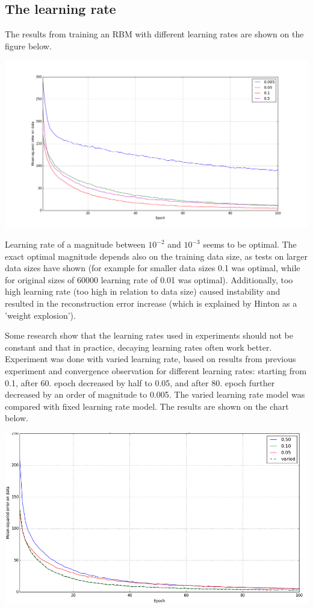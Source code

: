 \documentclass[a4paper]{scrartcl}
\begin{document}
\subsection{The learning rate}
\par The results from training an RBM with different learning rates are shown on the figure below.
\begin{center}
\includegraphics[width=14cm]{images/lr.png}
\end{center}
Learning rate of a magnitude between $10^{-2}$ and $10^{-3}$ seems to be optimal. The exact optimal magnitude depends also on the training data size, as tests on larger data sizes have shown (for example for smaller data sizes 0.1 was optimal, while for original sizes of 60000 learning rate of 0.01 was optimal). Additionally, too high learning rate (too high in relation to data size) caused instability and resulted in the reconstruction error increase (which is explained by Hinton \cite{Hinton} as a 'weight explosion'). 
\par Some research \cite{Tieleman} show that the learning rates used in experiments should not be constant and that in practice, decaying learning rates often work better. Experiment was done with varied learning rate, based on results from previous experiment and convergence observation for different learning rates: starting from 0.1, after 60. epoch decreased by half to 0.05, and after 80. epoch further decreased by an order of magnitude to 0.005. The varied learning rate model was compared with fixed learning rate model. The results are shown on the chart below.
\begin{center}
\includegraphics[width=14cm]{images/lr_var.png}
\end{center}
\end{document}
